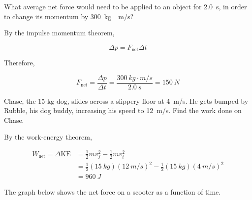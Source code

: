 \documentclass[]{exam}
\newif\ifversionKlevel
\begin{document}
\begin{questions}
\question
What average net force would need to be applied to an object for \SI{2.0}{s}, in order to change its momentum by \SI{300}{kg\cdot m/s}?

\begin{solutionorbox}[3cm]
By the impulse momentum theorem,

\begin{equation*}
    \Delta p = F_\mathrm{net} \Delta t
\end{equation*}

Therefore,

\begin{equation*}
    F_\mathrm{net} = \frac{\Delta p}{\Delta t} = \frac{\SI{300}{kg\cdot m/s}}{\SI{2.0}{s}} = \boxed{\SI{150}{N}}
\end{equation*}
\end{solutionorbox}

\ifversionKlevel
\question
Chase, the 15-kg dog, slides across a slippery floor at \SI{4}{m/s}. He gets bumped by Rubble, his dog buddy, increasing his speed to \SI{12}{m/s}. Find the work done on Chase.

\begin{solutionorbox}[3cm]
By the work-energy theorem,

\vspace{-1em}
\begin{align*}
    W_\text{net} = \Delta \mathrm{KE} &= \frac{1}{2}mv_f^2 - \frac{1}{2}m v_i^2 \\[1ex]
    &= \frac{1}{2} (\SI{15}{kg}) (\SI{12}{m/s})^2 - \frac{1}{2} (\SI{15}{kg}) (\SI{4}{m/s})^2 \\[1ex]
    &= \boxed{\SI{960}{J}}
\end{align*}   
\end{solutionorbox}

\question
The graph below shows the net force on a scooter as a function of time.

\begin{center}
\end{center}


\end{questions}
\end{document}
